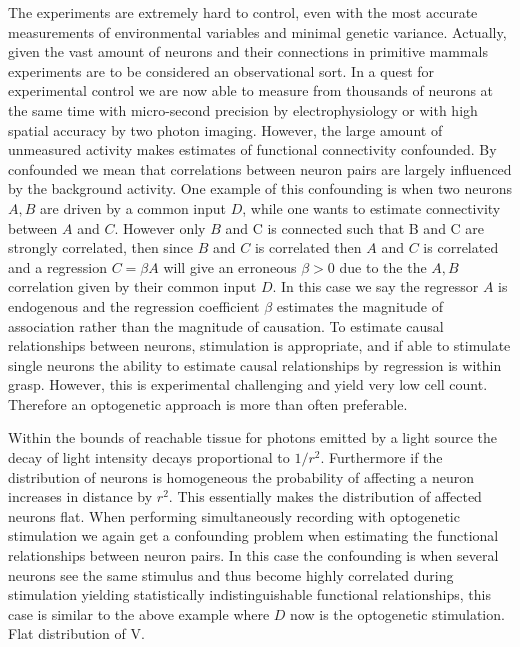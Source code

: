 \documentclass[11pt]{article}
\begin{document}
 The experiments are extremely hard to control, even with the most accurate measurements of environmental variables and minimal genetic variance. Actually, given the vast amount of neurons and their connections in primitive mammals experiments are to be considered an observational sort. In a quest for experimental control we are now able to measure from thousands of neurons at the same time with micro-second precision by electrophysiology or with high spatial accuracy by two photon imaging. However, the large amount of unmeasured activity makes estimates of functional connectivity confounded. By confounded we mean that correlations between neuron pairs are largely influenced by the background activity. One example of this confounding is when two neurons $ A,B $ are driven by a common input $ D $, while one wants to estimate connectivity between $ A $ and $ C $. However only $ B $ and C is connected such that B and C are strongly correlated, then since $ B $ and $ C $ is correlated then $ A $ and $ C $ is correlated and a regression $ C = \beta A $ will give an erroneous $ \beta > 0 $ due to the the $ A,B $ correlation given by their common input $ D $. In this case we say the regressor $ A $ is endogenous and the regression coefficient $ \beta $ estimates the magnitude of association rather than the magnitude of causation. To estimate causal relationships between neurons, stimulation is appropriate, and if able to stimulate single neurons the ability to estimate causal relationships by regression is within grasp. However, this is experimental challenging and yield very low cell count. Therefore an optogenetic approach is more than often preferable.

Within the bounds of reachable tissue for photons emitted by a light source the decay of light intensity decays proportional to $ 1/r^2 $. Furthermore if the distribution of neurons is homogeneous the probability of affecting a neuron increases in distance by $ r^2 $. This essentially makes the distribution of affected neurons flat. When performing simultaneously recording with optogenetic stimulation we again get a confounding problem when estimating the functional relationships between neuron pairs. In this case the confounding is when several neurons see the same stimulus and thus become highly correlated during stimulation yielding statistically indistinguishable functional relationships, this case is similar to the above example where $ D $ now is the optogenetic stimulation. Flat distribution of V.
\end{document}
